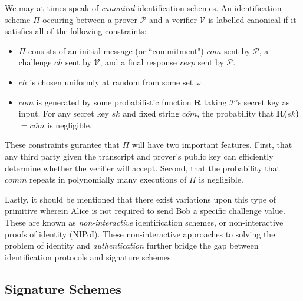 \noindent
We may at times speak of \emph{canonical} identification schemes. An identification scheme $\Pi$ occuring between a prover $\mathcal{P}$ and a verifier $\mathcal{V}$ is labelled canonical if it satisfies all of the following constraints:
\begin{itemize}
\item $\Pi$ consists of an initial message (or ``commitment") $com$ sent by $\mathcal{P}$, a challenge $ch$ sent by $\mathcal{V}$, and a final response $resp$ sent by $\mathcal{P}$.
\item $ch$ is chosen uniformly at random from some set $\omega$.
\item $com$ is generated by some probabilistic function \textbf{R} taking $\mathcal{P}$'s secret key as input. For any secret key $sk$ and fixed string $\bar{com}$, the probability that \textbf{R($sk$)} $= \bar{com}$ is negligible. 
\end{itemize}

These constraints gurantee that $\Pi$ will have two important features. First, that any third party given the transcript and prover's public key can efficiently determine whether the verifier will accept. Second, that the probability that $comm$ repeats in polynomially many executions of $\Pi$ is negligible.  

Lastly, it should be mentioned that there exist variations upon this type of primitive wherein Alice is not required to send Bob a specific challenge value. These are known as \emph{non-interactive} identification schemes, or non-interactive proofs of identity (NIPoI). These non-interactive approaches to solving the problem of identity and \emph{authentication} further bridge the gap between identification protocols and signature schemes. 

\subsection{Signature Schemes}

